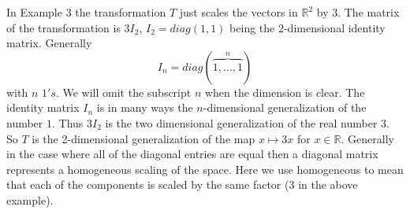 \documentclass{book}
\begin{document}

In Example 3 the transformation $T$ just scales the vectors in $\mathbb{R}^2$ by $3$. The matrix of the transformation is $3I_2$, $I_2=diag(1,1)$ being the $2$-dimensional identity matrix. Generally 
$$
I_n=diag(\overset{n}{\overbrace{1,\ldots,1}})
$$ 
with $n$ $1's$. We will omit the subscript $n$ when the dimension is clear. The identity matrix $I_n$ is in many ways the $n$-dimensional generalization of the number $1$. Thus $3I_2$ is the two dimensional generalization of the real number $3$. So $T$ is the 2-dimensional generalization of the map $x \mapsto 3x$ for $x \in \mathbb{R}$.  Generally in the case where all of the diagonal entries are equal then a diagonal matrix represents a homogeneous scaling of the space. Here we use homogeneous to mean that each of the components is scaled by the same factor ($3$ in the above example).
\end{document}
